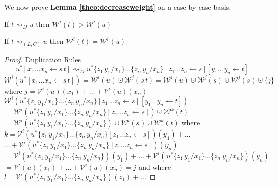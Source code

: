 \documentclass[a4paper,UKenglish,cleveref, autoref]{lipics-v2019}
\newcommand{\set}[1]{ \{ #1 \} }
\newcommand{\app}[2]{#1 \, #2}
\newcommand{\share}[3]{#1 [#2 \leftarrow #3]}
\newcommand{\sub}[3]{#1 \{ #2 / #3 \}}
\newcommand{\weight}[2]{\mathcal{W}^{#1}(#2)}
\newcommand{\weightvar}[2]{\mathcal{V}^{#1}(#2)}
\begin{document}
We now prove {\bf Lemma \ref{theo:decreaseweight}} on a case-by-case basis.
\begin{center}
If $t \rightsquigarrow_{D} u$ then $\weight{i}{t} > \weight{i}{u}$
\end{center}

\begin{center}
If $t \rightsquigarrow_{(L, C)} u$ then $\weight{i}{t} = \weight{i}{u}$
\end{center}

\begin{proof}
Duplication Rules
\newline
$$\share{u^{*}}{x_{1} \dots x_{n}}{\app{s}{t}} \rightsquigarrow_{D} \share{\share{\sub{\sub{u^{*}}{\app{z_{1}}{y_{1}}}{x_{1}}\dots}{\app{z_{n}}{y_{n}}}{x_{n}}}{z_{1} \dots z_{n}}{s}}{y_{1} \dots y_{n}}{t}$$
$\weight{i}{\share{u^{*}}{x_{1} \dots x_{n}}{\app{s}{t}}} = \weight{i}{u} \cupdot \weight{j}{\app{s}{t}}
= \weight{i}{u} \cupdot \weight{j}{s} \cupdot \weight{j}{s} \cupdot \set{j}$
\newline
where $j = \weightvar{i}{u}(x_{1}) + \dots + \weightvar{i}{u}(x_{n})$
\newline
$\weight{i}{\share{\share{\sub{\sub{u^{*}}{\app{z_{1}}{y_{1}}}{x_{1}}\dots}{\app{z_{n}}{y_{n}}}{x_{n}}}{z_{1} \dots z_{n}}{s}}{y_{1} \dots y_{n}}{t}}$
\newline
$= \weight{i}{\share{\sub{\sub{u^{*}}{\app{z_{1}}{y_{1}}}{x_{1}}\dots}{\app{z_{n}}{y_{n}}}{x_{n}}}{z_{1} \dots z_{n}}{s}} \cupdot \weight{k}{t}$
\newline
$= \weight{i}{\sub{\sub{u^{*}}{\app{z_{1}}{y_{1}}}{x_{1}}\dots}{\app{z_{n}}{y_{n}}}{x_{n}}} \cupdot \weight{l}{s} \cupdot \weight{k}{t}$
\newline
where $k = \weightvar{i}{\share{\sub{\sub{u^{*}}{\app{z_{1}}{y_{1}}}{x_{1}}\dots}{\app{z_{n}}{y_{n}}}{x_{n}}}{z_{1} \dots z_{n}}{s}}(y_{1}) + \dots$
\newline
\indent $\dots + \weightvar{i}{\share{\sub{\sub{u^{*}}{\app{z_{1}}{y_{1}}}{x_{1}}\dots}{\app{z_{n}}{y_{n}}}{x_{n}}}{z_{1} \dots z_{n}}{s}}(y_{n})$
\newline
$= \weightvar{i}{\sub{\sub{u^{*}}{\app{z_{1}}{y_{1}}}{x_{1}}\dots}{\app{z_{n}}{y_{n}}}{x_{n}}}(y_{1}) + \dots + \weightvar{i}{\sub{\sub{u^{*}}{\app{z_{1}}{y_{1}}}{x_{1}}\dots}{\app{z_{n}}{y_{n}}}{x_{n}}}(y_{n})$
\newline
$= \weightvar{i}{u}(x_{1}) + \dots + \weightvar{i}{u}(x_{n}) = j$
\newline
and where $l = \weightvar{i}{\sub{\sub{u^{*}}{\app{z_{1}}{y_{1}}}{x_{1}}\dots}{\app{z_{n}}{y_{n}}}{x_{n}}}(z_{1}) + \dots$

\end{proof}
\end{document}
